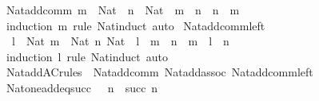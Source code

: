 \begin{isabellebody}
%
\isadelimproof
\isanewline
%
\endisadelimproof
\isanewline
{}\isamarkupfalse%
\ Nat{\isacharunderscore}{\kern0pt}add{\isacharunderscore}{\kern0pt}comm{\isacharcolon}{\kern0pt}\ {\isachardoublequoteopen}m\ {\isacharcolon}{\kern0pt}\ Nat\ {\isasymLongrightarrow}\ n\ {\isacharcolon}{\kern0pt}\ Nat\ {\isasymLongrightarrow}\ m\ {\isacharplus}{\kern0pt}\ n\ {\isacharequal}{\kern0pt}\ n\ {\isacharplus}{\kern0pt}\ m{\isachardoublequoteclose}\isanewline
%
\isadelimproof
\ \ %
\endisadelimproof
%
\isatagproof
{}\isamarkupfalse%
\ {\isacharparenleft}{\kern0pt}induction\ m\ rule{\isacharcolon}{\kern0pt}\ Nat{\isacharunderscore}{\kern0pt}induct{\isacharparenright}{\kern0pt}\ auto%
\endisatagproof
{\isafoldproof}%
%
\isadelimproof
\isanewline
%
\endisadelimproof
\isanewline
{}\isamarkupfalse%
\ Nat{\isacharunderscore}{\kern0pt}add{\isacharunderscore}{\kern0pt}comm{\isacharunderscore}{\kern0pt}left{\isacharcolon}{\kern0pt}\isanewline
\ \ {\isachardoublequoteopen}{\isasymlbrakk}l\ {\isacharcolon}{\kern0pt}\ Nat{\isacharsemicolon}{\kern0pt}\ m\ {\isacharcolon}{\kern0pt}\ Nat{\isacharsemicolon}{\kern0pt}\ n{\isacharcolon}{\kern0pt}\ Nat{\isasymrbrakk}\ {\isasymLongrightarrow}\ l\ {\isacharplus}{\kern0pt}\ {\isacharparenleft}{\kern0pt}m\ {\isacharplus}{\kern0pt}\ n{\isacharparenright}{\kern0pt}\ {\isacharequal}{\kern0pt}\ m\ {\isacharplus}{\kern0pt}\ {\isacharparenleft}{\kern0pt}l\ {\isacharplus}{\kern0pt}\ n{\isacharparenright}{\kern0pt}{\isachardoublequoteclose}\isanewline
%
\isadelimproof
\ \ %
\endisadelimproof
%
\isatagproof
{}\isamarkupfalse%
\ {\isacharparenleft}{\kern0pt}induction\ l\ rule{\isacharcolon}{\kern0pt}\ Nat{\isacharunderscore}{\kern0pt}induct{\isacharparenright}{\kern0pt}\ auto%
\endisatagproof
{\isafoldproof}%
%
\isadelimproof
\isanewline
%
\endisadelimproof
\isanewline
{}\isamarkupfalse%
\ Nat{\isacharunderscore}{\kern0pt}add{\isacharunderscore}{\kern0pt}AC{\isacharunderscore}{\kern0pt}rules\ {\isacharequal}{\kern0pt}\ Nat{\isacharunderscore}{\kern0pt}add{\isacharunderscore}{\kern0pt}comm\ Nat{\isacharunderscore}{\kern0pt}add{\isacharunderscore}{\kern0pt}assoc\ Nat{\isacharunderscore}{\kern0pt}add{\isacharunderscore}{\kern0pt}comm{\isacharunderscore}{\kern0pt}left\isanewline
\isanewline
{}\isamarkupfalse%
\ Nat{\isacharunderscore}{\kern0pt}one{\isacharunderscore}{\kern0pt}add{\isacharunderscore}{\kern0pt}eq{\isacharunderscore}{\kern0pt}succ{\isacharcolon}{\kern0pt}\ {\isachardoublequoteopen}{}\ {\isacharplus}{\kern0pt}\ n\ {\isacharequal}{\kern0pt}\ succ\ n{\isachardoublequoteclose}\isanewline

\end{isabellebody}
